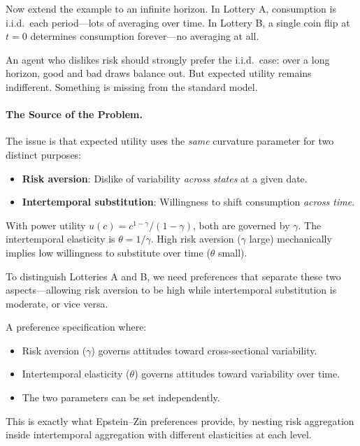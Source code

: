 \begin{calloutnote}
Now extend the example to an infinite horizon. In Lottery A, consumption is i.i.d.\ each period---lots of averaging over time. In Lottery B, a single coin flip at $t=0$ determines consumption forever---no averaging at all. 

An agent who dislikes risk should strongly prefer the i.i.d.\ case: over a long horizon, good and bad draws balance out. But expected utility remains indifferent. Something is missing from the standard model.
\end{calloutnote}

\paragraph{The Source of the Problem.}
The issue is that expected utility uses the \emph{same} curvature parameter for two distinct purposes:
\begin{itemize}[leftmargin=2em]
    \item \textbf{Risk aversion}: Dislike of variability \emph{across states} at a given date.
    \item \textbf{Intertemporal substitution}: Willingness to shift consumption \emph{across time}.
\end{itemize}
With power utility $u(c) = c^{1-\gamma}/(1-\gamma)$, both are governed by $\gamma$. The intertemporal elasticity is $\theta = 1/\gamma$. High risk aversion ($\gamma$ large) mechanically implies low willingness to substitute over time ($\theta$ small).

To distinguish Lotteries A and B, we need preferences that separate these two aspects---allowing risk aversion to be high while intertemporal substitution is moderate, or vice versa.

\begin{calloutimportant}
A preference specification where:
\begin{itemize}[leftmargin=1.5em]
    \item Risk aversion ($\gamma$) governs attitudes toward cross-sectional variability.
    \item Intertemporal elasticity ($\theta$) governs attitudes toward variability over time.
    \item The two parameters can be set independently.
\end{itemize}
This is exactly what Epstein--Zin preferences provide, by nesting risk aggregation inside intertemporal aggregation with different elasticities at each level.
\end{calloutimportant}

